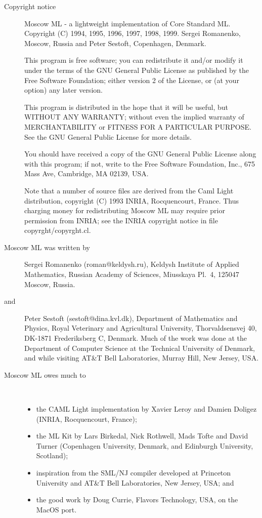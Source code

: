 \documentclass[fleqn]{article}
\begin{document}
\begin{description}
\item[Copyright notice] Moscow ML - a lightweight implementation of
  Core Standard ML\@.  Copyright (C) 1994, 1995, 1996, 1997, 1998, 1999.
  Sergei Romanenko, Moscow, Russia and Peter Sestoft, Copenhagen,
  Denmark.

This program is free software; you can redistribute it and/or
modify it under the terms of the GNU General Public License
as published by the Free Software Foundation; either version 2
of the License, or (at your option) any later version.

This program is distributed in the hope that it will be useful,
but WITHOUT ANY WARRANTY; without even the implied warranty of
MERCHANTABILITY or FITNESS FOR A PARTICULAR PURPOSE.  See the
GNU General Public License for more details.

You should have received a copy of the GNU General Public License
along with this program; if not, write to the Free Software
Foundation, Inc., 675 Mass Ave, Cambridge, MA 02139, USA.

Note that a number of source files are derived from the Caml Light
distribution, copyright (C) 1993 INRIA, Rocquencourt, France.
Thus charging money for redistributing Moscow ML may require prior
permission from INRIA; see the INRIA copyright notice in file
copyrght/copyrght.cl.\\[2ex]


\item[Moscow ML was written by] Sergei Romanenko
  (roman@keldysh.ru), Keldysh Institute of Applied Mathematics, 
  Russian Academy of Sciences, Miusskaya Pl.\ 4, 125047 Moscow, Russia.
\item[and] Peter Sestoft (sestoft@dina.kvl.dk), Department of
  Mathematics and Physics, Royal Veterinary and Agricultural
  University, Thorvaldsensvej 40, DK-1871 Frederiksberg C, Denmark.
  Much of the work was done at the Department of Computer Science at
  the Technical University of Denmark, and while visiting AT\&T Bell
  Laboratories, Murray Hill, New Jersey, USA.\\[2ex]

\item[Moscow ML owes much to]\mbox{ }
\begin{itemize}
\item the CAML Light implementation by Xavier Leroy and Damien
  Doligez (INRIA, Rocquencourt, France);
\item the ML Kit by Lars Birkedal, Nick Rothwell, Mads Tofte and David
  Turner (Copenhagen University, Denmark, and Edinburgh University,
  Scotland);
\item inspiration from the SML/NJ compiler developed at Princeton
  University and AT\&T Bell Laboratories, New Jersey, USA; and
\item the good work by Doug Currie, Flavors Technology, USA, on the
  MacOS port.
\end{itemize}
\end{description}
\end{document}
